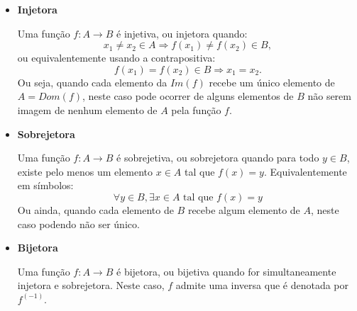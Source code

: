\begin{itemize}
 \item \textbf{Injetora}

 Uma função $f: A \rightarrow B$ é injetiva, ou injetora quando:
\begin{equation}
 x_1 \neq x_2 \in A \Rightarrow f(x_1) \neq f(x_2) \in B ,
\end{equation}
 ou equivalentemente usando a contrapositiva:
\begin{equation}
f(x_1) = f(x_2) \in B \Rightarrow x_1 = x_2 .
\end{equation}
 Ou seja, quando cada elemento da $Im(f)$ recebe um único elemento de $A= Dom(f)$, neste caso pode ocorrer de alguns elementos de $B$ não serem imagem de nenhum elemento de $A$ pela função $f$.

 \item \textbf{Sobrejetora}

 Uma função $f: A \rightarrow B$ é sobrejetiva, ou sobrejetora quando para todo $y \in B$, existe pelo menos um elemento $x \in A$ tal que $f(x) = y$. Equivalentemente em símbolos:
\begin{equation}
\forall y \in B, \exists x \in A \text{ tal que } f(x) = y
\end{equation}
 Ou ainda, quando cada elemento de $B$ recebe algum elemento de $A$, neste caso podendo não ser único.

 \item \textbf{Bijetora}

 Uma função $f: A \rightarrow B$ é bijetora, ou bijetiva quando for simultaneamente injetora e sobrejetora. Neste caso, $f$ admite uma inversa que é denotada por $f^{(-1)}$.

\end{itemize}

